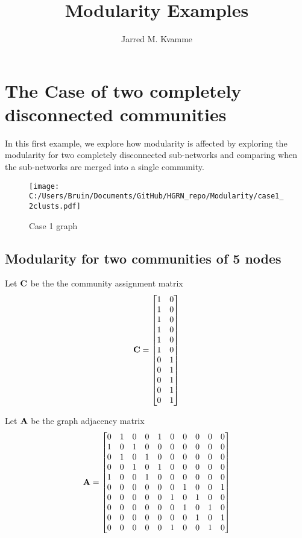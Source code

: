 \documentclass[a4paper,12pt]{article}
\begin{document}
	\begin{titlepage}
		\title{Modularity Examples}
		\author[1]{Jarred M. Kvamme}
		\maketitle
	\end{titlepage}
	
	
	\newpage
	\tableofcontents{}
	\listoftables
	\listoffigures
	\newpage
	
	\section{The Case of two completely disconnected communities}
	In this first example, we explore how modularity is affected by exploring the modularity for two completely disconnected sub-networks and comparing when the sub-networks are merged into a single community.
	\begin{figure}[H]
		\centering
		\caption{Case 1 graph}
		\texttt{[image: C:/Users/Bruin/Documents/GitHub/HGRN\_repo/Modularity/case1\_2clusts.pdf]}
		\label{fig:case1}
	\end{figure}
	\subsection*{Modularity for two communities of 5 nodes}
	Let $\bf{C}$ be the the community assignment matrix 
	\[ {\bf C} = \begin{bmatrix}1 & 0 \\ 1 & 0 \\ 1 & 0 \\ 1 & 0 \\ 1 & 0 \\ 1 & 0 \\ 0 & 1 \\ 0 & 1 \\ 0 & 1 \\ 0 & 1 \\ 0 & 1 \\
	\end{bmatrix}\] 
	
	Let $\bf A$ be the graph adjacency matrix
	\[ {\bf A} = \begin{bmatrix}
		0& 1& 0& 0& 1& 0& 0& 0& 0& 0\\
		1& 0& 1& 0& 0& 0& 0& 0& 0& 0\\
		0& 1& 0& 1& 0& 0& 0& 0& 0& 0\\
		0& 0& 1& 0& 1& 0& 0& 0& 0& 0\\
		1& 0& 0& 1& 0& 0& 0& 0& 0& 0\\
		0& 0& 0& 0& 0& 0& 1& 0& 0& 1\\
		0& 0& 0& 0& 0& 1& 0& 1& 0& 0\\
		0& 0& 0& 0& 0& 0& 1& 0& 1& 0\\
		0& 0& 0& 0& 0& 0& 0& 1& 0& 1\\
		0& 0& 0& 0& 0& 1& 0& 0& 1& 0
	\end{bmatrix}\] 
	
\end{document}

